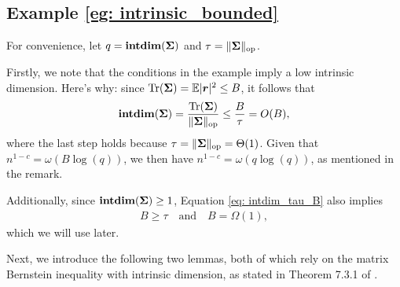 \subsection{Example \ref{eg: intrinsic_bounded}}\label{apdx: example_bernstein}


For convenience, let $q = \textbf{intdim}({\bm{\Sigma}})$ and $\tau = \lVert {\bm{\Sigma}} \rVert_{\mathrm{op}}$.

Firstly, we note that the conditions in the example imply a low intrinsic dimension. Here’s why: since $\operatorname{Tr}({\bm{\Sigma}}) = \mathbb{E} |{\bm{r}}|^2 \leq B$, it follows that
\begin{align} \label{eq: intdim_tau_B} \textbf{intdim}({\bm{\Sigma}}) = \frac{\operatorname{Tr}({\bm{\Sigma}})}{\lVert {\bm{\Sigma}} \rVert_{\mathrm{op}}} \leq \frac{B}{\tau} = O(B), \end{align}
where the last step holds because $\tau = \lVert {\bm{\Sigma}} \rVert_{\mathrm{op}} = \Theta(1)$. Given that $n^{1-c} = \omega(B \log(q))$, we then have $n^{1-c} = \omega(q \log(q))$, as mentioned in the remark.

Additionally, since $\textbf{intdim}({\bm{\Sigma}}) \geq 1$, Equation \ref{eq: intdim_tau_B} also implies
\begin{align} \label{eq: B_tau_relation} B \geq \tau \quad \text{and} \quad B = \Omega(1), \end{align}
which we will use later.

Next, we introduce the following two lemmas, both of which rely on the matrix Bernstein inequality with intrinsic dimension, as stated in Theorem 7.3.1 of \cite{tropp2015introduction}.

